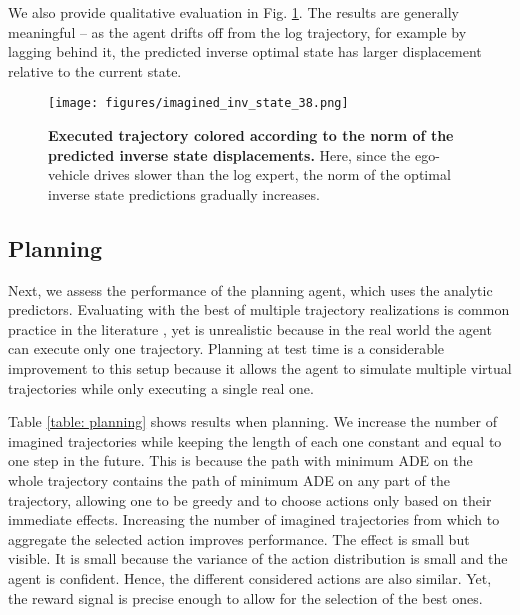 We also provide qualitative evaluation in Fig. \ref{fig: inverse_state_preds}. The results are generally meaningful -- as the agent drifts off from the log trajectory, for example by lagging behind it, the predicted inverse optimal state has larger displacement relative to the current state.

\begin{figure}[h]
    \centering
    \texttt{[image: figures/imagined\_inv\_state\_38.png]}
    \captionsetup{belowskip=-0.35cm, aboveskip=0.2cm}
    \caption{\textbf{Executed trajectory colored according to the norm of the predicted inverse state displacements.} Here, since the ego-vehicle drives slower than the log expert, the norm of the optimal inverse state predictions gradually increases.}
    \label{fig: inverse_state_preds}
\end{figure}



\subsection{Planning}
Next, we assess the performance of the planning agent, which uses the analytic predictors. Evaluating with the best of multiple trajectory realizations is common practice in the literature \cite{ettinger2021large, montali2024waymo, caesar2020nuscenes}, yet is unrealistic because in the real world the agent can execute only one trajectory. Planning at test time is a considerable improvement to this setup because it allows the agent to simulate multiple virtual trajectories while only executing a single real one.

Table \ref{table: planning} shows results when planning. We increase the number of imagined trajectories while keeping the length of each one constant and equal to one step in the future. This is because the path with minimum ADE on the whole trajectory contains the path of minimum ADE on any part of the trajectory, allowing one to be greedy and to choose actions only based on their immediate effects. Increasing the number of imagined trajectories from which to aggregate the selected action improves performance. The effect is small but visible. It is small because the variance of the action distribution is small and the agent is confident. Hence, the different considered actions are also similar. Yet, the reward signal is precise enough to allow for the selection of the best ones.

